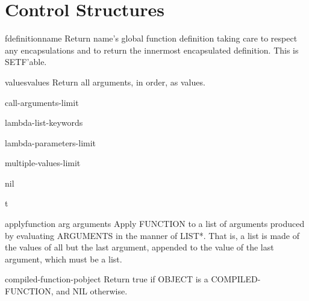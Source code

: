 \chapter{Control Structures}

\begin{accessor}{fdefinition}{name}{}{}
  Return name's global function definition taking care to respect any
   encapsulations and to return the innermost encapsulated definition.
   This is SETF'able.
\end{accessor}

\begin{accessor}{values}{\rest values}{}{}
  Return all arguments, in order, as values.
\end{accessor}

\begin{constant}{call-arguments-limit}{}{}{}
  
\end{constant}

\begin{constant}{lambda-list-keywords}{}{}{}
  
\end{constant}

\begin{constant}{lambda-parameters-limit}{}{}{}
  
\end{constant}

\begin{constant}{multiple-values-limit}{}{}{}
  
\end{constant}

\begin{constant}{nil}{}{}{}
  
\end{constant}

\begin{constant}{t}{}{}{}
  
\end{constant}

\begin{function}{apply}{function arg \rest arguments}{}{}
  Apply FUNCTION to a list of arguments produced by evaluating ARGUMENTS in
  the manner of LIST*. That is, a list is made of the values of all but the
  last argument, appended to the value of the last argument, which must be a
  list.
\end{function}

\begin{function}{compiled-function-p}{object}{}{}
  Return true if OBJECT is a COMPILED-FUNCTION, and NIL otherwise.
\end{function}


